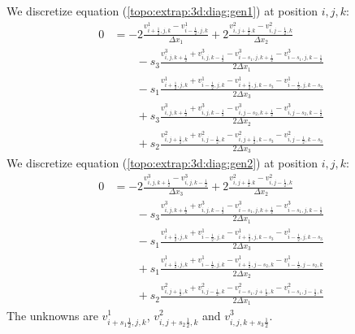 We discretize equation (\ref{topo:extrap:3d:diag:gen1}) at position $i,j,k$:
\begin{equation}\label{extrap:3d:3:eq3}
 \begin{split}
	0&=-2\frac{v^{1}_{i+\frac{1}{2},j,k}-v^{1}_{i-\frac{1}{2},j,k}}{\Delta x_1}+2\frac{v^{2}_{i,j+\frac{1}{2}.k}-v^{2}_{i,j-\frac{1}{2},k}}{\Delta x_2}\\
	&\qquad -s_3\frac{v^{3}_{i,j,k+\frac{1}{2}}+v^{3}_{i,j,k-\frac{1}{2}}-v^{3}_{i-s_1,j,k+\frac{1}{2}}-v^{3}_{i-s_1,j,k-\frac{1}{2}}}{2\Delta x_1}\\
	&\qquad -s_1\frac{v^{1}_{i+\frac{1}{2},j,k}+v^1_{i-\frac{1}{2},j,k}-v^{1}_{i+\frac{1}{2},j,k-s_3}-v^{1}_{i-\frac{1}{2},j,k-s_3}}{2\Delta x_3}\\
	&\qquad +s_3\frac{v^{3}_{i,j,k+\frac{1}{2}}+v^{3}_{i,j,k-\frac{1}{2}}-v^{3}_{i,j-s_2,k+\frac{1}{2}}-v^{3}_{i,j-s_2,k-\frac{1}{2}}}{2\Delta x_2}\\
	&\qquad +s_2\frac{v^{2}_{i,j+\frac{1}{2},k}+v^2_{i,j-\frac{1}{2},k}-v^{2}_{i,j+\frac{1}{2},k-s_3}-v^{2}_{i,j-\frac{1}{2},k-s_3}}{2\Delta x_3}
\end{split}
	\end{equation}
We discretize equation (\ref{topo:extrap:3d:diag:gen2}) at position $i,j,k$:
\begin{equation}\label{extrap:3d:3:eq2}
\begin{split}
	0&=-2\frac{v^{3}_{i,j,k+\frac{1}{2}}-v^{3}_{i,j,k-\frac{1}{2}}}{\Delta x_3}+2\frac{v^{2}_{i,j+\frac{1}{2}.k}-v^{2}_{i,j-\frac{1}{2},k}}{\Delta x_2}\\
	&\qquad -s_3\frac{v^{3}_{i,j,k+\frac{1}{2}}+v^{3}_{i,j,k-\frac{1}{2}}-v^{3}_{i-s_1,j,k+\frac{1}{2}}-v^{3}_{i-s_1,j,k-\frac{1}{2}}}{2\Delta x_1}\\
	&\qquad -s_1\frac{v^{1}_{i+\frac{1}{2},j,k}+v^1_{i-\frac{1}{2},j,k}-v^{1}_{i+\frac{1}{2},j,k-s_3}-v^{1}_{i-\frac{1}{2},j,k-s_3}}{2\Delta x_3}\\
	&\qquad +s_1\frac{v^{1}_{i+\frac{1}{2},j,k}+v^{1}_{i-\frac{1}{2},j,k}-v^{1}_{i+\frac{1}{2},j-s_2,k}-v^{1}_{i-\frac{1}{2},j-s_2,k}}{2\Delta x_2}\\
	&\qquad +s_2\frac{v^{2}_{i,j+\frac{1}{2},k}+v^2_{i,j-\frac{1}{2},k}-v^{2}_{i-s_1,j+\frac{1}{2},k}-v^{2}_{i-s_1,j-\frac{1}{2},k}}{2\Delta x_1}
\end{split}
	\end{equation}
The unknowns are $v^{1}_{i+s_1\frac{1}{2},j,k}$, $v^2_{i,j+s_2\frac{1}{2},k}$ and $v^{3}_{i,j,k+s_3\frac{1}{2}}$.

